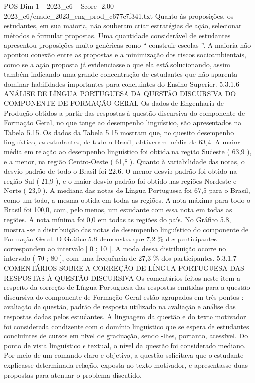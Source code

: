 \begin{textsample}{POS Dim 1 – 2023\_c6 – Score -2.00 – 2023\_c6/enade\_2023\_eng\_prod\_c677c7f341.txt}
Quanto às proposições, os estudantes, em sua maioria, não souberam criar estratégias de ação, selecionar métodos e formular propostas.
Uma quantidade considerável de estudantes apresentou proposições muito genéricas como “ construir escolas ”.
A maioria não apontou conexão entre as propostas e a minimização dos riscos socioambientais, como se a ação proposta já evidenciasse o que ela está solucionando, assim também indicando uma grande concentração de estudantes que não aparenta dominar habilidades importantes para concluintes do Ensino Superior. 5.3.1.6 ANÁLISE DE LÍNGUA PORTUGUESA DA QUESTÃO DISCURSIVA DO COMPONENTE DE FORMAÇÃO GERAL Os dados de Engenharia de Produção obtidos a partir das respostas à questão discursiva do componente de Formação Geral, no que tange ao desempenho linguístico, são apresentados na Tabela 5.15.
Os dados da Tabela 5.15 mostram que, no quesito desempenho linguístico, os estudantes, de todo o Brasil, obtiveram média de 63,4.
A maior média em relação ao desempenho linguístico foi obtida na região Sudeste ( 63,9 ), e a menor, na região Centro-Oeste ( 61,8 ).
Quanto à variabilidade das notas, o desvio-padrão de todo o Brasil foi 22,6.
O menor desvio-padrão foi obtido na região Sul ( 21,9 ), e o maior desvio-padrão foi obtido nas regiões Nordeste e Norte ( 23,9 ).
A mediana das notas de Língua Portuguesa foi 67,5 para o Brasil, como um todo, a mesma obtida em todas as regiões.
A nota máxima para todo o Brasil foi 100,0, com, pelo menos, um estudante com essa nota em todas as regiões.
A nota mínima foi 0,0 em todas as regiões do país.
No Gráfico 5.8, mostra -se a distribuição das notas de desempenho linguístico do componente de Formação Geral.
O Gráfico 5.8 demonstra que 7,2 \% dos participantes correspondem ao intervalo [ 0 ; 10 ].
A moda dessa distribuição ocorre no intervalo ( 70 ; 80 ], com uma frequência de 27,3 \% dos participantes. 5.3.1.7 COMENTÁRIOS SOBRE A CORREÇÃO DE LÍNGUA PORTUGUESA DAS RESPOSTAS À QUESTÃO DISCURSIVA Os comentários feitos neste item a respeito da correção de Língua Portuguesa das respostas emitidas para a questão discursiva do componente de Formação Geral estão agrupados em três pontos : avaliação da questão, padrão de resposta utilizado na avaliação e análise das respostas dadas pelos estudantes.
A linguagem da questão e do texto motivador foi considerada condizente com o domínio linguístico que se espera de estudantes concluintes de cursos em nível de graduação, sendo -lhes, portanto, acessível.
Do ponto de vista linguístico e textual, o nível da questão foi considerado mediano.
Por meio de um comando claro e objetivo, a questão solicitava que o estudante explicasse determinada relação, exposta no texto motivador, e apresentasse duas propostas para atenuar o problema discutido.

\end{textsample}
